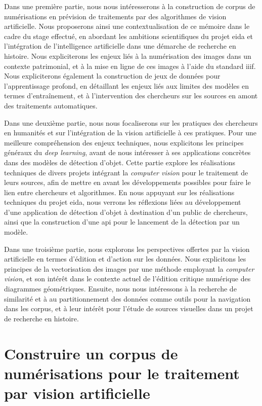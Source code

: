 \documentclass[a4paper,12pt,twoside]{book}
\newcommand{\api}{\gls{api}\xspace}
\newcommand{\cv}{\textit{computer vision}\xspace}
\newcommand{\dl}{\textit{deep learning}\xspace}
\newcommand{\eida}{\gls{eida}\xspace}
\newcommand{\ia}{intelligence artificielle\xspace}
\newcommand{\iiif}{\gls{iiif}\xspace}
\newcommand{\clearemptydoublepage}{\newpage{\pagestyle{empty}\cleardoublepage}}
\begin{document}
	Dans une première partie, nous nous intéresserons à la construction de corpus de numérisations en prévision de traitements par des algorithmes de vision artificielle. Nous proposerons ainsi une contextualisation de ce mémoire dans le cadre du stage effectué, en abordant les ambitions scientifiques du projet \eida et l'intégration de l'\ia dans une démarche de recherche en histoire. Nous expliciterons les enjeux liés à la numérisation des images dans un contexte patrimonial, et à la mise en ligne de ces images à l'aide du standard \iiif. Nous expliciterons également la construction de jeux de données pour l'apprentissage profond, en détaillant les enjeux liés aux limites des modèles en termes d'entraînement, et à l'intervention des chercheurs sur les sources en amont des traitements automatiques.
	
	Dans une deuxième partie, nous nous focaliserons sur les pratiques des chercheurs en humanités et sur l'intégration de la vision artificielle à ces pratiques. Pour une meilleure compréhension des enjeux techniques, nous explicitons les principes généraux du \dl, avant de nous intéresser à ses applications concrètes dans des modèles de détection d'objet. Cette partie explore les réalisations techniques de divers projets intégrant la \cv pour le traitement de leurs sources, afin de mettre en avant les développements possibles pour faire le lien entre chercheurs et algorithmes. En nous appuyant sur les réalisations techniques du projet \eida, nous verrons les réflexions liées au développement d'une application de détection d'objet à destination d'un public de chercheurs, ainsi que la construction d'une \api pour le lancement de la détection par un modèle.
	
	Dans une troisième partie, nous explorons les perspectives offertes par la vision artificielle en termes d'édition et d'action sur les données. Nous explicitons les principes de la vectorisation des images par une méthode employant la \cv, et son intérêt dans le contexte actuel de l'édition critique numérique des diagrammes géométriques. Ensuite, nous nous intéressons à la recherche de similarité et à au partitionnement des données comme outils pour la navigation dans les corpus, et à leur intérêt pour l'étude de sources visuelles dans un projet de recherche en histoire.
    \clearemptydoublepage

\mainmatter

    \part{Construire un corpus de numérisations pour le traitement par vision artificielle}
\end{document}
